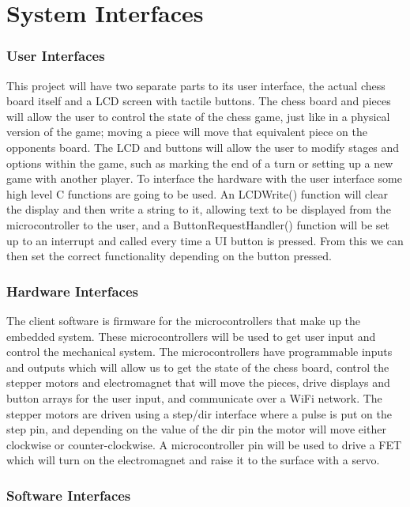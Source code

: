 \documentclass{article}
\begin{document}
\section*{System Interfaces}

\subsubsection*{User Interfaces}
\indent

This project will have two separate parts to its user interface, the actual chess board itself and a LCD screen with tactile buttons. The chess board and pieces will allow the user to control the state of the chess game, just like in a physical version of the game; moving a piece will move that equivalent piece on the opponents board. The LCD and buttons will allow the user to modify stages and options within the game, such as marking the end of a turn or setting up a new game with another player. To interface the hardware with the user interface some high level C functions are going to be used. An LCDWrite() function will clear the display and then write a string to it, allowing text to be displayed from the microcontroller to the user, and a ButtonRequestHandler() function will be set up to an interrupt and called every time a UI button is pressed. From this we can then set the correct functionality depending on the button pressed.

\subsubsection*{Hardware Interfaces}
\indent

The client software is firmware for the microcontrollers that make up the embedded system. These microcontrollers will be used to get user input and control the mechanical system. The microcontrollers have programmable inputs and outputs which will allow us to get the state of the chess board, control the stepper motors and electromagnet that will move the pieces, drive displays and button arrays for the user input, and communicate over a WiFi network. The stepper motors are driven using a step/dir interface where a pulse is put on the step pin, and depending on the value of the dir pin the motor will move either clockwise or counter-clockwise. A microcontroller pin will be used to drive a FET which will turn on the electromagnet and raise it to the surface with a servo.

\subsubsection*{Software Interfaces}
\indent
\end{document}
